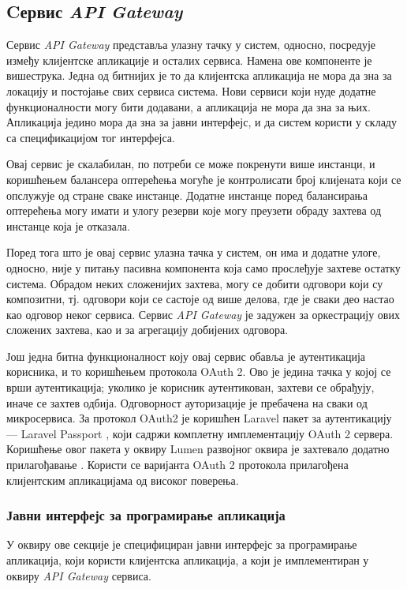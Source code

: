 \documentclass[12pt,oneside]{memoir}
\begin{document}
\subsection{Cервис \textit{API Gateway}}
Сервис \textit{API Gateway} представља улазну тачку у систем, односно, посредује између клијентске апликације и осталих сервиса. Намена ове компоненте је вишеструка. Једна од битнијих је то да клијентска апликација не мора да зна за локацију и постојање свих сервиса система. Нови сервиси који нуде додатне функционалности могу бити додавани, а апликација не мора да зна за њих. Апликација једино мора да зна за јавни интерфејс, и да систем користи у складу са спецификацијом тог интерфејса.

Овај сервис је скалабилан, по потреби се може покренути више инстанци, и коришћењем балансера оптерећења могуће је контролисати број клијената који се опслужује од стране сваке инстанце. Додатне инстанце поред балансирања оптерећења могу имати и улогу резерви које могу преузети обраду захтева од инстанце која је отказала.

Поред тога што је овај сервис улазна тачка у систем, он има и додатне улоге, односно, није у питању пасивна компонента која само прослеђује захтеве остатку система. Обрадом неких сложенијих захтева, могу се добити одговори који су композитни, тј. одговори који се састоје од више делова, где је сваки део настао као одговор неког сервиса. Сервис \textit{API Gateway} је задужен за оркестрацију ових сложених захтева, као и за агрегацију добијених одговора.

Још једна битна функционалност коју овај сервис обавља је аутентикација корисника, и то коришћењем протокола OAuth 2. Ово је једина тачка у којој се врши аутентикација; уколико је корисник аутентикован, захтеви се обрађују, иначе се захтев одбија. Одговорност ауторизације је пребачена на сваки од микросервиса. За протокол OAuth2 је коришћен Laravel пакет за аутентикацију --- Laravel Passport \cite{laravel_passport}, који садржи комплетну имплементацију OAuth 2 сервера. Коришћење овог пакета у оквиру Lumen развојног оквира је захтевало додатно прилагођавање \cite{laravel_passport_in_lumen}. Користи се варијанта OAuth 2 протокола прилагођена клијентским апликацијама од високог поверења.

\subsubsection{Јавни интерфејс за програмирање апликација}
У оквиру ове секције је специфициран јавни интерфејс за програмирање апликација, који користи клијентска апликација, а који је имплементиран у оквиру \textit{API Gateway} сервиса.
\end{document}
